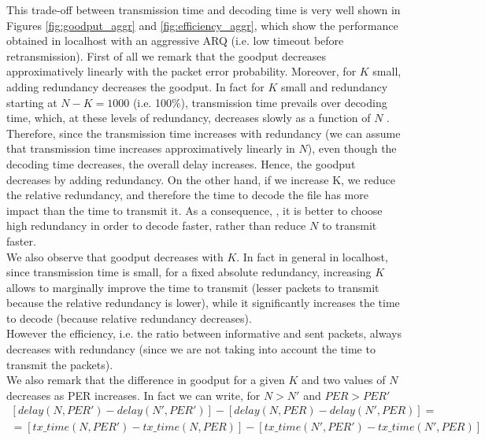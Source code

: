 This trade-off between transmission time and decoding time is very well shown in Figures \ref{fig:goodput_aggr} and \ref{fig:efficiency_aggr}, which show the performance obtained in localhost with an aggressive ARQ (i.e. low  timeout before retransmission). First of all we remark that the goodput  decreases approximatively linearly with the packet error probability. Moreover, for $K$ small, adding redundancy decreases the goodput. In fact for $K$ small and redundancy starting at $N-K=1000$ (i.e. 100\%), transmission time prevails over decoding time, which, at these levels of redundancy, decreases slowly as a function of $N$ . Therefore, since the transmission time increases with redundancy (we can assume that transmission time increases approximatively linearly in $N$), even though the decoding time decreases, the overall delay increases. Hence, the goodput decreases by adding redundancy. 
On the other hand, if we increase K, we reduce the relative redundancy, and therefore the time to decode the file has more impact than the time to transmit it. As a consequence, , it is better to choose high redundancy in order to decode faster, rather than reduce $N$ to transmit faster.\\
We also observe that goodput decreases with $K$. In fact in general in localhost, since transmission time is small, for a fixed absolute redundancy, increasing $K$ allows to marginally improve the time to transmit (lesser packets to transmit because the relative redundancy is lower), while it significantly increases the time to decode (because  relative redundancy decreases). \\
However the efficiency, i.e. the ratio between informative and sent packets, always decreases with redundancy (since we are not taking into account the time to transmit the packets).\\
We also remark that the difference in goodput for a given $K$ and two values of $N$ decreases as PER increases. In fact we can write, for $N>N'$ and $PER>PER'$
\begin{equation*}
\begin{split}
[delay(N,PER')-delay(N',PER')]-[delay(N,PER)-delay(N',PER)]=\\
=[tx\_time(N,PER')-tx\_time(N,PER)]-[tx\_time(N',PER')-tx\_time(N',PER)]
\end{split}
\end{equation*}
